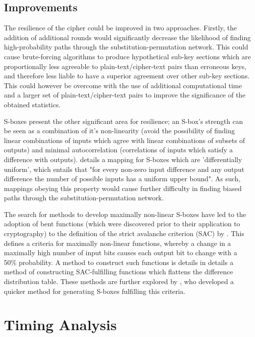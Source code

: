 \documentclass[british,10pt,a4paper]{article}
\begin{document}
\subsection{Improvements}
The resilience of the cipher could be improved in two approaches. Firstly, the addition of additional rounds would significantly decrease the likelihood of finding high-probability paths through the substitution-permutation network. This could cause brute-forcing algorithms to produce hypothetical sub-key sections which are proportionally less agreeable to plain-text/cipher-text pairs than erroneous keys, and therefore less liable to have a superior agreement over other sub-key sections. This could however be overcome with the use of additional computational time and a larger set of plain-text/cipher-text pairs to improve the significance of the obtained statistics.

S-boxes present the other significant area for resilience; an S-box's strength can be seen as a combination of it's non-linearity (avoid the possibility of finding linear combinations of inputs which agree with linear combinations of subsets of outputs) and minimal autocorrelation (correlations of inputs which satisfy a difference with outputs). \citet{nyberg} details a mapping for S-boxes which are 'differentially uniform', which entails that "for every non-zero input difference and any output difference the number of possible inputs has a uniform upper bound". As such, mappings obeying this property would cause further difficulty in finding biased paths through the substitution-permutation network.  

The search for methods to develop maximally non-linear S-boxes have led to the adoption of bent functions (which were discovered prior to their application to cryptography) to the definition of the strict avalanche criterion (SAC) by \citet{Forre1990-ll}. This defines a criteria for maximally non-linear functions, whereby a change in a maximally high number of input bits causes each output bit to change with a 50\% probability. A method to construct such functions is details in \citeauthor{Forre1990-ll} details a method of constructing SAC-fulfilling functions which flattens the difference distribution table. These methods are further explored by \citet{Adams1990-nz}, who developed a quicker method for generating S-boxes fulfilling this criteria.


\clearpage
\section{Timing Analysis}
\end{document}
